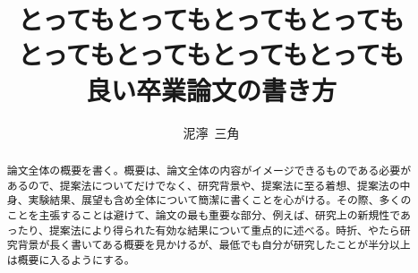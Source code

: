 \documentclass[12pt,a4paper,twoside,openany]{book}
\title{とってもとってもとってもとっても\\とってもとってもとってもとっても\\良い卒業論文の書き方}
\affiliation{東京大学工学部精密工学科}
\author{泥濘~三角}
\theoremstyle{definition}
\begin{document}
\frontmatter
\maketitle

\begin{abstract}
  論文全体の概要を書く。概要は、論文全体の内容がイメージできるものである必要があるので、提案法についてだけでなく、研究背景や、提案法に至る着想、提案法の中身、実験結果、展望も含め全体について簡潔に書くことを心がける。その際、多くのことを主張することは避けて、論文の最も重要な部分、例えば、研究上の新規性であったり、提案法により得られた有効な結果について重点的に述べる。時折、やたら研究背景が長く書いてある概要を見かけるが、最低でも自分が研究したことが半分以上は概要に入るようにする。
\end{abstract}

\tableofcontents  %
\clearpage

\listoffigures    %
\clearpage

\listoftables     %
\clearpage

\mainmatter











% 
% 

\printbibliography[title=参考文献, heading=bibintoc]


\begin{appendices}
  
  
\end{appendices}

\end{document}
